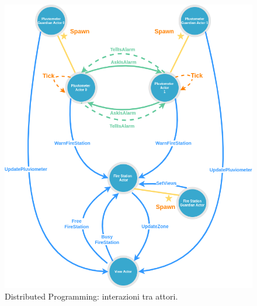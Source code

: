 \documentclass[12pt,a4paper,openright,twoside]{book}
\begin{document}
\begin{figure}
	\centering
	\includegraphics[width=\textwidth]{figures/distributed-programming-actors-interactions2.png}
	\caption{Distributed Programming: interazioni tra attori.}
	\label{fig:dpai2}
\end{figure}
\end{document}
